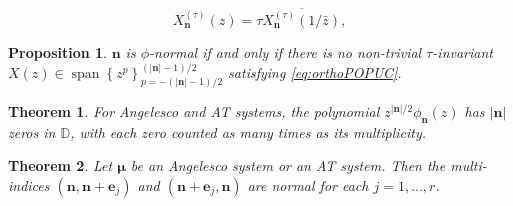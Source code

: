 \documentclass[10pt,a4paper]{amsart}
\newtheorem{prop}{Proposition}
\newtheorem{thm}{Theorem}
\newcommand{\D}{\mathbb{D}}
\newcommand{\abs}[1]{\left|#1\right|}
\newcommand{\set}[1]{\left\{#1\right\}}
\begin{document}
\begin{equation}\label{eq:beta invariance}
    X_{\bm{n}}^{(\tau)}(z) = \tau\overline{X_{\bm{n}}^{(\tau)}(1/\bar{z})},
\end{equation}

\begin{prop}\label{prop:popuc normality}
    $\bm{n}$ is $\phi$-normal if and only if there is no non-trivial $\tau$-invariant $X(z) \in \operatorname{span}\set{z^p}_{p = -(\abs{\bm{n}}-1)/2}^{(\abs{\bm{n}}-1)/2}$ satisfying \eqref{eq:orthoPOPUC}. 
\end{prop}

\begin{thm}\label{thm:zeros in unit disc}
    For Angelesco and AT systems, the polynomial $z^{\abs{\bm{n}}/2}\phi_{\bm{n}}(z)$ has $\abs{\bm{n}}$ zeros in $\D$, with each zero counted as many times as its multiplicity. 
\end{thm}

\begin{thm}\label{thm:normality of hp polynomials}
    Let $\bm{\mu}$ be an Angelesco system or an AT system. Then the multi-indices $(\bm{n},\bm{n}+\bm{e}_j)$ and $(\bm{n}+\bm{e}_j,\bm{n})$ are normal for each $j = 1,\dots,r$. %
\end{thm}
\end{document}

